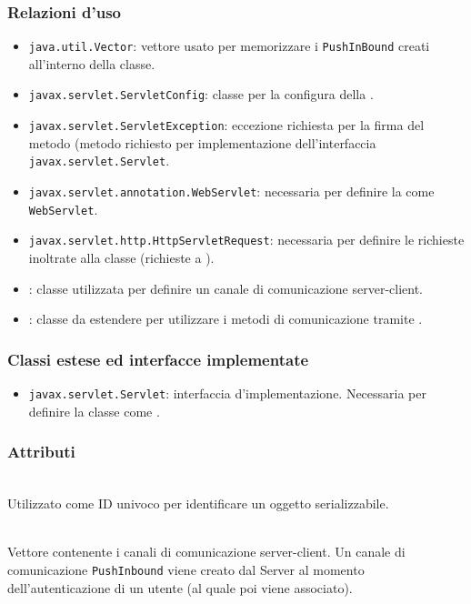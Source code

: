 \subsubsection*{Relazioni d'uso}
\begin{itemize}
	\item \texttt{java.util.Vector}: vettore usato per memorizzare i \texttt{PushInBound} creati all'interno della classe.
	\item \texttt{javax.servlet.ServletConfig}: classe per la configura della . 
	\item \texttt{javax.servlet.ServletException}: eccezione richiesta per la firma del metodo  (metodo richiesto per implementazione dell'interfaccia \texttt{javax.servlet.Servlet}.
	\item \texttt{javax.servlet.annotation.WebServlet}: necessaria per definire la  come \texttt{WebServlet}.
	\item \texttt{javax.servlet.http.HttpServletRequest}: necessaria per definire le richieste inoltrate alla classe (richieste a ).
	\item {}: classe utilizzata per definire un canale di comunicazione server-client.
	\item {}: classe da estendere per utilizzare i metodi di comunicazione tramite .
\end{itemize}

\subsubsection*{Classi estese ed interfacce implementate}
\begin{itemize}
	\item \texttt{javax.servlet.Servlet}: interfaccia d'implementazione. Necessaria per definire la classe come .
\end{itemize}

\subsubsection*{Attributi}
\begin{description}
  \item{}\\
  Utilizzato come ID univoco per identificare un oggetto serializzabile.
  \item{}\\
  Vettore contenente i canali di comunicazione server-client. Un canale di comunicazione \texttt{PushInbound} viene creato dal Server al momento dell'autenticazione di un utente (al quale poi viene associato).
\end{description}

